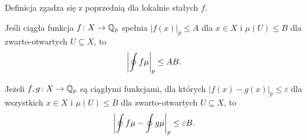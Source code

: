 Definicja zgadza się z poprzednią dla lokalnie stałych $f$.

\begin{fakt}
	Jeśli ciągła funkcja $f \colon X \to \mathbb Q_p$ spełnia $|f(x)|_p \le A$ dla $x \in X$ i $\mu(U) \le B$ dla zwarto-otwartych $U \subseteq X$, to
	\[
		\left| \oint f \mu \right|_p \le AB.
	\]
\end{fakt}

\begin{wniosek}
	Jeżeli $f, g \colon X \to \mathbb Q_p$ są ciągłymi funkcjami, dla których $|f(x) - g(x)|_p \le \varepsilon$ dla wszystkich $x \in X$ i $\mu(U) \le B$ dla zwarto-otwartych $U \subseteq X$, to
	\[
		\left|\oint f \mu - \oint g\mu\right|_p \le \varepsilon B.
	\]
\end{wniosek}
